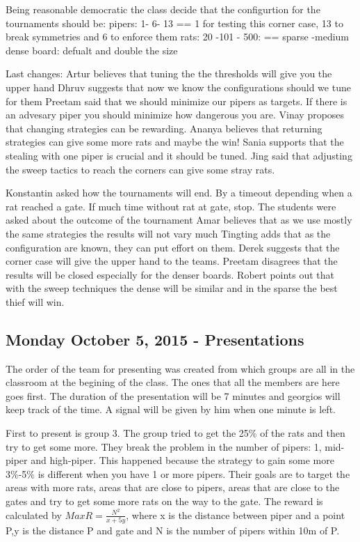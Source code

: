 Being reasonable democratic the class decide that the configurtion for the tournaments should be:
pipers: 1- 6- 13 == 1 for testing this corner case, 13 to break symmetries and 6 to enforce them
rats: 20 -101 - 500: == sparse -medium dense
board: defualt and double the size

Last changes:
Artur believes that tuning the the thresholds will give you the upper hand
Dhruv suggests that now we know the configurations should we tune for them
Preetam said that we should minimize our pipers as targets. If there is an advesary piper
you should minimize how dangerous you are.
Vinay proposes that changing strategies can be rewarding.
Ananya believes that returning strategies can give some more rats and maybe the win!
Sania supports that the stealing with one piper is crucial and it should be tuned.
Jing said that adjusting the sweep tactics to reach the corners can give some 
stray rats.

Konstantin asked how the tournaments will end. By a timeout depending when a rat 
reached a gate. If much time without rat at gate, stop.
The students were asked about the outcome of the tournament
Amar believes that as we use mostly the same strategies the results will not vary much
Tingting adds that as the configuration are known, they can put effort on them.
Derek suggests that the corner case will give the upper hand to the teams.
Preetam disagrees that the results will be closed especially for the denser boards.
Robert points out that with the sweep techniques the dense will be similar and in the sparse the best thief will win.

\subsection{Monday October 5, 2015 - Presentations}

The order of the team for presenting was created from which groups are all in the
classroom at the begining of the class. The ones that all the members are here
goes first. The duration of the presentation will be 7 minutes and georgios will 
keep track of the time. A signal will be given by him when one minute is left.

First to present is group 3.
The group tried to get the 25\% of the rats and then try to get some more. They
break the problem in the number of pipers: 1, mid-piper and high-piper. This
happened because the strategy to gain some more 3\%-5\% is different when you
have 1 or more pipers. Their goals are to target the areas with more rats, areas
that are close to pipers, areas that are close to the gates and try to get some
more rats on the way to the gate. The reward is calculated by $Max R = \frac{N^2}{x+5y}$, 
where x is the distance between piper and a point P,y is the distance P and gate
 and N is the number of pipers within 10m of P.

